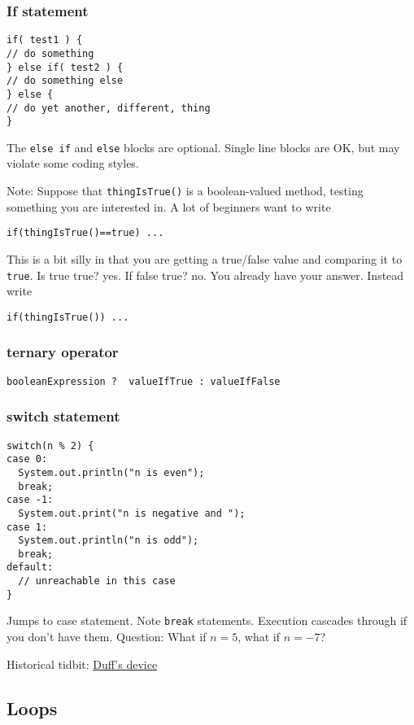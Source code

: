 \documentclass[11pt,letterpaper]{amsart}
\begin{document}
\subsubsection{If statement}
\begin{verbatim}
if( test1 ) {
// do something
} else if( test2 ) {
// do something else
} else {
// do yet another, different, thing
}
\end{verbatim}
The \texttt{else if} and \texttt{else} blocks are optional. Single
line blocks are OK, but may violate some coding styles.


Note: Suppose that \texttt{thingIsTrue()} is a boolean-valued method,
testing something you are interested in. A lot of beginners want to
write
\begin{verbatim}
if(thingIsTrue()==true) ...
\end{verbatim}
This is a bit silly in that you are getting a true/false value and
comparing it to \texttt{true}. Is true true? yes. If false true?
no. You already have your answer. Instead write
\begin{verbatim}
if(thingIsTrue()) ...
\end{verbatim}

\subsubsection{ternary operator} 

\begin{verbatim}
booleanExpression ?  valueIfTrue : valueIfFalse
\end{verbatim}

\subsubsection{switch statement}
\begin{verbatim}
switch(n % 2) {
case 0:
  System.out.println("n is even");
  break;
case -1:
  System.out.print("n is negative and ");
case 1:
  System.out.println("n is odd");
  break;
default:
  // unreachable in this case
}
\end{verbatim}
Jumps to case statement. Note \texttt{break} statements. Execution
cascades through if you don't have them. Question: What if $n=5$, what
if $n=-7$? 

Historical tidbit: \href{https://en.wikipedia.org/wiki/Duff's_device}{Duff's device}

\subsection{Loops}
\end{document}
